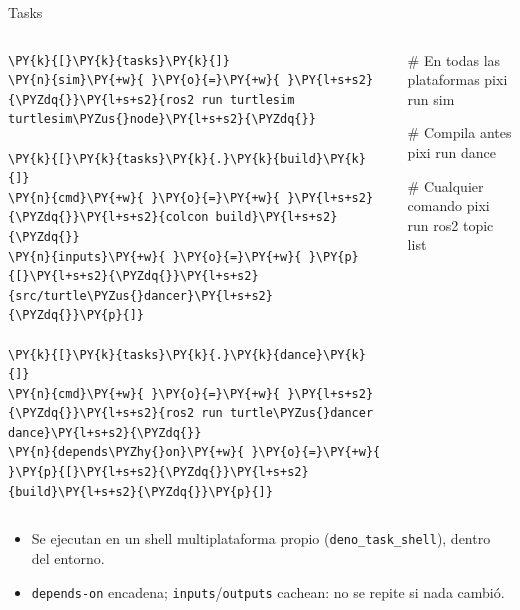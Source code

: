 \documentclass[aspectratio=169]{beamer}
\begin{document}
\begin{frame}[fragile]{Tasks}
\begin{columns}[T]
\begin{filelisting}
\begin{Verbatim}[commandchars=\\\{\},breaklines,breakanywhere]
\PY{k}{[}\PY{k}{tasks}\PY{k}{]}
\PY{n}{sim}\PY{+w}{ }\PY{o}{=}\PY{+w}{ }\PY{l+s+s2}{\PYZdq{}}\PY{l+s+s2}{ros2 run turtlesim turtlesim\PYZus{}node}\PY{l+s+s2}{\PYZdq{}}

\PY{k}{[}\PY{k}{tasks}\PY{k}{.}\PY{k}{build}\PY{k}{]}
\PY{n}{cmd}\PY{+w}{ }\PY{o}{=}\PY{+w}{ }\PY{l+s+s2}{\PYZdq{}}\PY{l+s+s2}{colcon build}\PY{l+s+s2}{\PYZdq{}}
\PY{n}{inputs}\PY{+w}{ }\PY{o}{=}\PY{+w}{ }\PY{p}{[}\PY{l+s+s2}{\PYZdq{}}\PY{l+s+s2}{src/turtle\PYZus{}dancer}\PY{l+s+s2}{\PYZdq{}}\PY{p}{]}

\PY{k}{[}\PY{k}{tasks}\PY{k}{.}\PY{k}{dance}\PY{k}{]}
\PY{n}{cmd}\PY{+w}{ }\PY{o}{=}\PY{+w}{ }\PY{l+s+s2}{\PYZdq{}}\PY{l+s+s2}{ros2 run turtle\PYZus{}dancer dance}\PY{l+s+s2}{\PYZdq{}}
\PY{n}{depends\PYZhy{}on}\PY{+w}{ }\PY{o}{=}\PY{+w}{ }\PY{p}{[}\PY{l+s+s2}{\PYZdq{}}\PY{l+s+s2}{build}\PY{l+s+s2}{\PYZdq{}}\PY{p}{]}
\end{Verbatim}
\end{filelisting}
\begin{terminal}
# En todas las plataformas
pixi run sim

# Compila antes
pixi run dance

# Cualquier comando
pixi run ros2 topic list
\end{terminal}
\end{columns}
\vfill
\begin{itemize}
    \item Se ejecutan en un shell multiplataforma propio (\texttt{deno\_task\_shell}), dentro del entorno.
    \item \lstinline|depends-on| encadena; \lstinline|inputs|/\lstinline|outputs| cachean: no se repite si nada cambió.
\end{itemize}
\end{frame}
\end{document}
